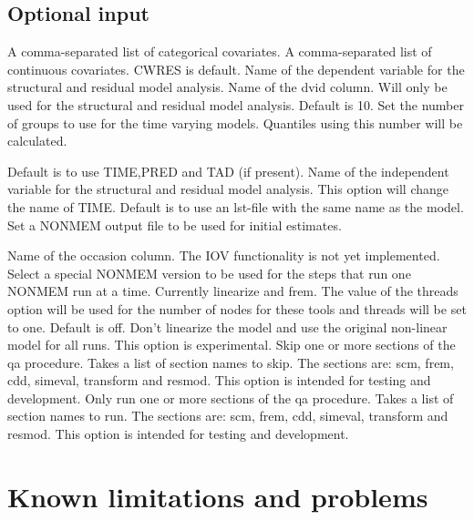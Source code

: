 \subsection{Optional input}

\begin{optionlist}
A comma-separated list of categorical covariates.
\nextopt
{}
A comma-separated list of continuous covariates.
\nextopt
{}
CWRES is default. Name of the dependent variable for the structural and residual model analysis. 
\nextopt
{}
Name of the dvid column.
Will only be used for the structural and residual model analysis.
\nextopt
{}
Default is 10. Set the number of groups to use for the time varying models.
Quantiles using this number will be calculated.

\nextopt
{}
Default is to use TIME,PRED and TAD (if present). Name of the independent variable for the structural and residual model analysis.
This option will change the name of TIME.
\nextopt
{}
Default is to use an lst-file with the same name as the model. Set a NONMEM output file to be used for initial estimates.

\nextopt
{}
Name of the occasion column. The IOV functionality is not yet implemented.
\nextopt
{}
	Select a special NONMEM version to be used for the steps
    that run one NONMEM run at a time. Currently linearize
    and frem. The value of the threads option will be used for
    the number of nodes for these tools and threads will be set
    to one.
\nextopt
{}
Default is off. Don't linearize the model and use the original non-linear model for all runs.
This option is experimental.
\nextopt
{}
Skip one or more sections of the qa procedure. Takes a list of section names to skip. The sections are: scm, frem, cdd, simeval,
transform and resmod. This option is intended for testing and development.
\nextopt
{}
Only run one or more sections of the qa procedure. Takes a list of section names to run. The sections are: scm, frem, cdd, simeval, transform and resmod. This option is intended for testing and development.
    \nextopt
\end{optionlist}

\section{Known limitations and problems}

